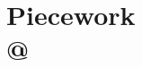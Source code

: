 \documentclass[presentation]{subfiles}
\begin{document}
\section{Piecework\\
{\hfill\footnotesize\citeauthor{pieceworkCrowdworkGigwork} @ }}



\end{document}
